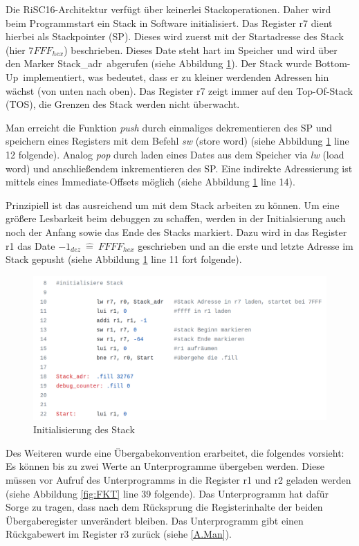 \documentclass[fleqn, a4paper, 11pt]{article}       %
\begin{document}
Die RiSC16-Architektur verfügt über keinerlei Stackoperationen. Daher wird beim Programmstart ein Stack in Software initialisiert. Das Register r7 dient hierbei als Stackpointer (SP). Dieses wird zuerst mit der Startadresse des Stack (hier $7FFF_{hex}$) beschrieben. Dieses Date steht hart im Speicher und wird über den Marker \glqq Stack\_adr\grqq \ abgerufen (siehe  Abbildung \ref{fig:Stack}).
Der Stack wurde  \glqq Bottom-Up\grqq \ implementiert, was bedeutet, dass er zu kleiner werdenden Adressen hin wächst (von unten nach oben). Das Register r7 zeigt immer auf den Top-Of-Stack (TOS), die Grenzen des Stack werden nicht überwacht.

Man erreicht die Funktion \emph{push}  durch einmaliges dekrementieren des SP und speichern eines Registers mit dem Befehl \emph{sw} (store word) (siehe Abbildung \ref{fig:Stack} line 12 folgende). Analog \emph{pop} durch laden eines Dates aus dem Speicher via \emph{lw} (load word) und anschließendem inkrementieren des SP. Eine indirekte Adressierung ist mittels eines Immediate-Offsets möglich (siehe Abbildung \ref{fig:Stack} line 14).

Prinzipiell ist das ausreichend um mit dem Stack arbeiten zu können. Um eine größere Lesbarkeit beim debuggen zu schaffen, werden in der Initialsierung auch noch der Anfang sowie das Ende des Stacks markiert. Dazu wird in das Register r1 das Date $-1_{dez}\ \widehat{=}\ FFFF_{hex}$ geschrieben und an die erste und letzte Adresse im Stack gepusht (siehe Abbildung \ref{fig:Stack} line 11 fort folgende).

\begin{figure}[h]
    \includegraphics[width =1\textwidth]{Stack_init.png}
\caption{Initialisierung des Stack}
\label{fig:Stack}
\end{figure}

Des Weiteren wurde eine Übergabekonvention erarbeitet, die folgendes vorsieht: Es können bis zu zwei Werte an Unterprogramme übergeben werden. Diese müssen vor Aufruf des Unterprogramms in die Register r1 und r2 geladen werden (siehe Abbildung \ref{fig:FKT} line 39 folgende). Das Unterprogramm hat dafür Sorge zu tragen, dass nach dem Rücksprung die Registerinhalte der beiden Übergaberegister unverändert bleiben. Das Unterprogramm gibt einen Rückgabewert im Register r3 zurück (siehe \ref{A.Man}).
\end{document}
